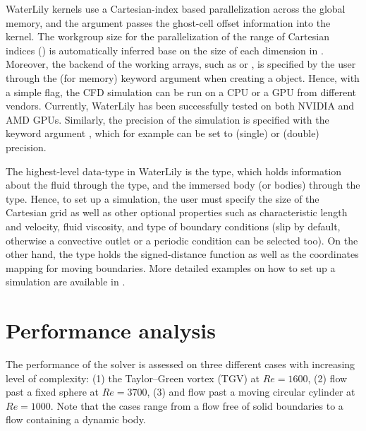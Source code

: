 \documentclass[10pt,a4paper]{article}
\begin{document}
WaterLily kernels use a Cartesian-index based parallelization across the global memory, and the  argument passes the ghost-cell offset information into the kernel. The workgroup size for the parallelization of the range of Cartesian indices () is automatically inferred base on the size of each dimension in . Moreover, the backend of the working arrays, such as  or , is specified by the user through the  (for memory) keyword argument when creating a  object. Hence, with a simple flag, the CFD simulation can be run on a CPU or a GPU from different vendors. Currently, WaterLily has been successfully tested on both NVIDIA and AMD GPUs. Similarly, the precision of the simulation is specified with the keyword argument , which for example can be set to  (single) or  (double) precision.

The highest-level data-type in WaterLily is the  type, which holds information about the fluid through the  type, and the immersed body (or bodies) through the  type. Hence, to set up a simulation, the user must specify the size of the Cartesian grid as well as other optional properties such as characteristic length and velocity, fluid viscosity, and type of boundary conditions (slip by default, otherwise a convective outlet or a periodic condition can be selected too). On the other hand, the  type holds the signed-distance function as well as the coordinates mapping for moving boundaries. More detailed examples on how to set up a simulation are available in .

\section{Performance analysis} \label{sec:performance}
The performance of the solver is assessed on three different cases with increasing level of complexity: (1) the Taylor--Green vortex (TGV) at $Re=1600$, (2) flow past a fixed sphere at $Re=3700$, (3) and flow past a moving circular cylinder at $Re=1000$. Note that the cases range from a flow free of solid boundaries to a flow containing a dynamic body.
\end{document}
